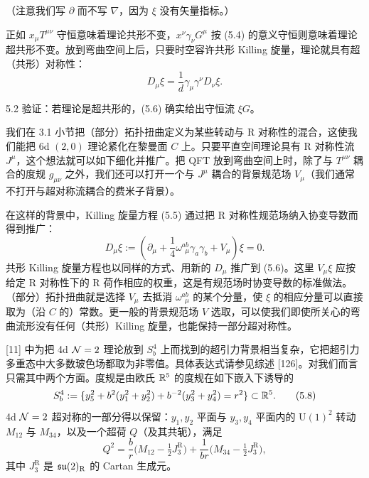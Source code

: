 
（注意我们写 $\partial$ 而不写 $\nabla$，因为 $\xi$ 没有矢量指标。）

正如 $x_\mu T^{\mu\nu}$ 守恒意味着理论共形不变，$x^\nu\gamma_\nu G^\mu$ 按 (5.4) 的意义守恒则意味着理论超共形不变。放到弯曲空间上后，只要时空容许共形 Killing 旋量，理论就具有超（共形）对称性：
\begin{equation}
  D_\mu\xi=\frac{1}{d}\gamma_\mu\gamma^\nu D_\nu\xi.
  \tag{5.6}
\end{equation}

\begin{exercise}{5.2}
验证：若理论是超共形的，(5.6) 确实给出守恒流 $\xi G$。
\end{exercise}

 我们在 3.1 小节把（部分）拓扑扭曲定义为某些转动与 R 对称性的混合，这使我们能把 6d $(2,0)$ 理论紧化在黎曼面 $C$ 上。只要平直空间理论具有 R 对称性流 $J^\mu$，这个想法就可以如下细化并推广。把 QFT 放到弯曲空间上时，除了与 $T^{\mu\nu}$ 耦合的度规 $g_{\mu\nu}$ 之外，我们还可以打开一个与 $J^\mu$ 耦合的背景规范场 $V_\mu$（我们通常不打开与超对称流耦合的费米子背景）。

在这样的背景中，Killing 旋量方程 (5.5) 通过把 R 对称性规范场纳入协变导数而得到推广：
\begin{equation}
  D_\mu\xi:=\left(\partial_\mu+\frac{1}{4}\omega^{ab}_{\ \ \mu}\gamma_a\gamma_b+V_\mu\right)\xi=0.
  \tag{5.7}
\end{equation}
共形 Killing 旋量方程也以同样的方式、用新的 $D_\mu$ 推广到 (5.6)。这里 $V_\mu\xi$ 应按给定 R 对称性下的 R 荷作相应的权重，这是有规范场时协变导数的标准做法。（部分）拓扑扭曲就是选择 $V_\mu$ 去抵消 $\omega^{ab}_{\ \ \mu}$ 的某个分量，使 $\xi$ 的相应分量可以直接取为（沿 $C$ 的）常数。更一般的背景规范场 $V$ 选取，可以使我们即使所关心的弯曲流形没有任何（共形）Killing 旋量，也能保持一部分超对称性。

 [11] 中为把 4d $\mathcal{N}=2$ 理论放到 $S^4_b$ 上而找到的超引力背景相当复杂，它把超引力多重态中大多数玻色场都取为非零值。具体表达式请参见综述 [126]。对我们而言只需其中两个方面。度规是由欧氏 $\mathbb{R}^5$ 的度规在如下嵌入下诱导的
\begin{equation}
  S^4_b:=\{y_5^2+b^2(y_1^2+y_2^2)+b^{-2}(y_3^2+y_4^2)=r^2\}\subset\mathbb{R}^5.
  \tag{5.8}
\end{equation}
4d $\mathcal{N}=2$ 超对称的一部分得以保留：$y_1,y_2$ 平面与 $y_3,y_4$ 平面内的 $\mathrm{U}(1)^2$ 转动 $M_{12}$ 与 $M_{34}$，以及一个超荷 $Q$（及其共轭），满足
\begin{equation}
  Q^2=\frac{b}{r}\big(M_{12}-\tfrac{1}{2}J_3^{\mathrm{R}}\big)
     +\frac{1}{br}\big(M_{34}-\tfrac{1}{2}J_3^{\mathrm{R}}\big),
  \tag{5.9}
\end{equation}
其中 $J_3^{\mathrm{R}}$ 是 $\mathfrak{su}(2)_{\mathrm{R}}$ 的 Cartan 生成元。

